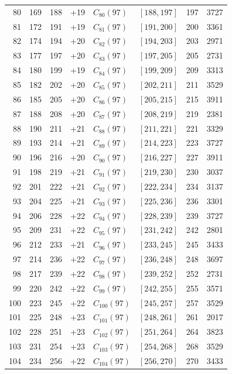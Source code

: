 \begin{longtable}{r r r r l c r r}
80 & 169 & 188 & +19 & $C_{80}(97)$ & $[188,197]$ & 197 & 3727\\
81 & 172 & 191 & +19 & $C_{81}(97)$ & $[191,200]$ & 200 & 3361\\
82 & 174 & 194 & +20 & $C_{82}(97)$ & $[194,203]$ & 203 & 2971\\
83 & 177 & 197 & +20 & $C_{83}(97)$ & $[197,205]$ & 205 & 2731\\
84 & 180 & 199 & +19 & $C_{84}(97)$ & $[199,209]$ & 209 & 3313\\
85 & 182 & 202 & +20 & $C_{85}(97)$ & $[202,211]$ & 211 & 3529\\
86 & 185 & 205 & +20 & $C_{86}(97)$ & $[205,215]$ & 215 & 3911\\
87 & 188 & 208 & +20 & $C_{87}(97)$ & $[208,219]$ & 219 & 2381\\
88 & 190 & 211 & +21 & $C_{88}(97)$ & $[211,221]$ & 221 & 3329\\
89 & 193 & 214 & +21 & $C_{89}(97)$ & $[214,223]$ & 223 & 3727\\
90 & 196 & 216 & +20 & $C_{90}(97)$ & $[216,227]$ & 227 & 3911\\
91 & 198 & 219 & +21 & $C_{91}(97)$ & $[219,230]$ & 230 & 3037\\
92 & 201 & 222 & +21 & $C_{92}(97)$ & $[222,234]$ & 234 & 3137\\
93 & 204 & 225 & +21 & $C_{93}(97)$ & $[225,236]$ & 236 & 3301\\
94 & 206 & 228 & +22 & $C_{94}(97)$ & $[228,239]$ & 239 & 3727\\
95 & 209 & 231 & +22 & $C_{95}(97)$ & $[231,242]$ & 242 & 2801\\
96 & 212 & 233 & +21 & $C_{96}(97)$ & $[233,245]$ & 245 & 3433\\
97 & 214 & 236 & +22 & $C_{97}(97)$ & $[236,248]$ & 248 & 3697\\
98 & 217 & 239 & +22 & $C_{98}(97)$ & $[239,252]$ & 252 & 2731\\
99 & 220 & 242 & +22 & $C_{99}(97)$ & $[242,255]$ & 255 & 3571\\
100 & 223 & 245 & +22 & $C_{100}(97)$ & $[245,257]$ & 257 & 3529\\
101 & 225 & 248 & +23 & $C_{101}(97)$ & $[248,261]$ & 261 & 2017\\
102 & 228 & 251 & +23 & $C_{102}(97)$ & $[251,264]$ & 264 & 3823\\
103 & 231 & 254 & +23 & $C_{103}(97)$ & $[254,268]$ & 268 & 3529\\
104 & 234 & 256 & +22 & $C_{104}(97)$ & $[256,270]$ & 270 & 3433\\

\end{longtable}
